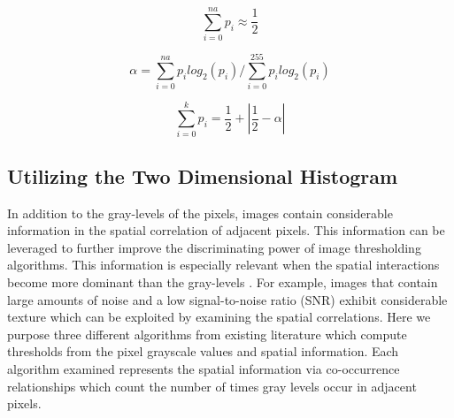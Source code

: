 \documentclass[journal]{IEEEtran}
\begin{document}
\begin{equation}
\label{eq:bpun}
\sum_{i=0}^{na} p_i \approx \frac{1}{2}
\end{equation}

\begin{equation}
\label{eq:apun}
\alpha = \sum_{i=0}^{na} p_i log_2(p_i) / \sum_{i=0}^{255} p_i log_2(p_i)
\end{equation}

\begin{equation}
\label{eq:tpun}
\sum_{i=0}^{k} p_i = \frac{1}{2} + |\frac{1}{2} - \alpha|
\end{equation}

\subsection{Utilizing the Two Dimensional Histogram}
\par In addition to the gray-levels of the pixels, images contain considerable information in the spatial correlation of adjacent pixels. This information can be leveraged to further improve the discriminating power of image thresholding algorithms. This information is especially relevant when the spatial interactions become more dominant than the gray-levels \cite{abutaleb}. For example, images that contain large amounts of noise and a low signal-to-noise ratio (SNR) exhibit considerable texture which can be exploited by examining the spatial correlations. Here we purpose three different algorithms from existing literature which compute thresholds from the pixel grayscale values and spatial information. Each algorithm examined represents the spatial information via co-occurrence relationships which count the number of times gray levels occur in adjacent pixels.
\end{document}
